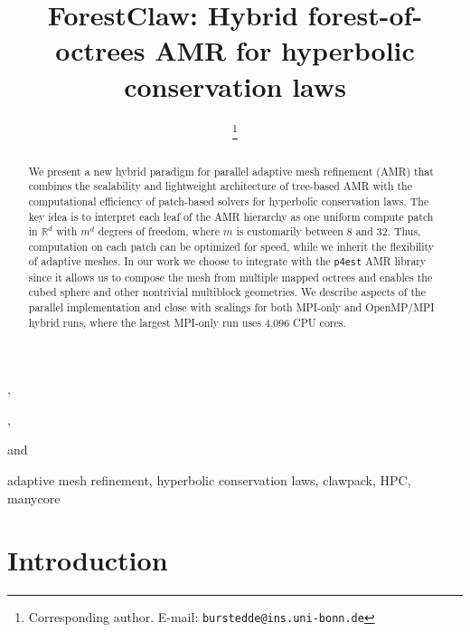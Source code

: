 \documentclass{IOS-Book-Article}     %
\newcommand{\sR}{\mathbb{R}}
\newcommand{\forestclaw}{ForestClaw\xspace}
\newcommand{\pforest}{\texttt{p4est}\xspace}
\begin{document}
\begin{frontmatter}          %
%
\title{\forestclaw:
        Hybrid forest-of-octrees AMR for hyperbolic conservation laws}
\runningtitle{\forestclaw}

%
\author[A]{ %
\thanks{Corresponding author.  E-mail: \texttt{burstedde@ins.uni-bonn.de}}},
\author[B]{ },
\author[C]{ } and
\author[C]{ }
\address[A]{Institut f\"ur Numerische Simulation, Universit\"at Bonn, Germany}
\address[B]{Boise State University, Idaho, USA}
\address[C]{Institute for Computational Engineering and Sciences,\\
The University of Texas at Austin, USA}

\begin{abstract}
We present a new hybrid paradigm for parallel adaptive mesh refinement (AMR)
that combines the scalability and lightweight architecture of tree-based AMR
with the computational efficiency of patch-based solvers for hyperbolic
conservation laws.  The key idea is to interpret each leaf of the AMR hierarchy
as one uniform compute patch in $\sR^d$ with $m^d$ degrees of freedom, where $m$ is
customarily between 8 and 32.  Thus, computation on each patch can be optimized
for speed, while we inherit the flexibility of adaptive meshes.  In our work we
choose to integrate with the \pforest AMR library since it allows us to compose
the mesh from multiple mapped octrees and enables the cubed sphere and other
nontrivial multiblock geometries.  We describe aspects of the parallel
implementation and close with scalings for both MPI-only and OpenMP/MPI hybrid
runs, where the largest MPI-only run uses 4,096 CPU cores.
\end{abstract}

\begin{keyword}
adaptive mesh refinement,
hyperbolic conservation laws,
clawpack,
HPC,
manycore
\end{keyword}

\end{frontmatter}


\section{Introduction}
\end{document}
